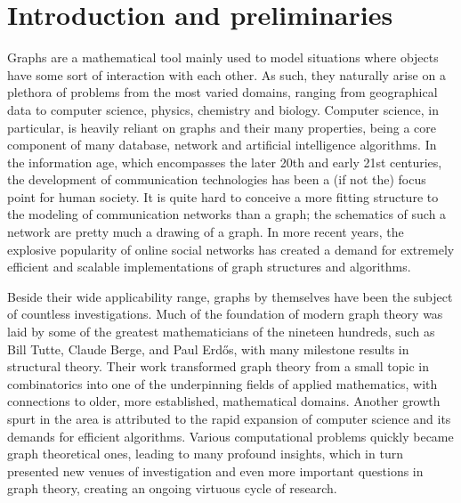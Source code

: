 \chapter{Introduction and preliminaries}
\label{ch:intro}

Graphs are a mathematical tool mainly used to model situations where objects have some sort of interaction with each other.
As such, they naturally arise on a plethora of problems from the most varied domains, ranging from geographical data to computer science, physics, chemistry and biology.
Computer science, in particular, is heavily reliant on graphs and their many properties, being a core component of many database, network and artificial intelligence algorithms.
In the information age, which encompasses the later 20th and early 21st centuries, the development of communication technologies has been a (if not the) focus point for human society.
It is quite hard to conceive a more fitting structure to the modeling of communication networks than a graph; the schematics of such a network are pretty much a drawing of a graph.
In more recent years, the explosive popularity of online social networks has created a demand for extremely efficient and scalable implementations of graph structures and algorithms.

Beside their wide applicability range, graphs by themselves have been the subject of countless investigations.
Much of the foundation of modern graph theory was laid by some of the greatest mathematicians of the nineteen hundreds, such as Bill Tutte, Claude Berge, and Paul Erd\H{o}s, with many milestone results in structural theory.
Their work transformed graph theory from a small topic in combinatorics into one of the underpinning fields of applied mathematics, with connections to older, more established, mathematical domains.
Another growth spurt in the area is attributed to the rapid expansion of computer science and its demands for efficient algorithms.
Various computational problems quickly became graph theoretical ones, leading to many profound insights, which in turn presented new venues of investigation and even more important questions in graph theory, creating an ongoing virtuous cycle of research.

